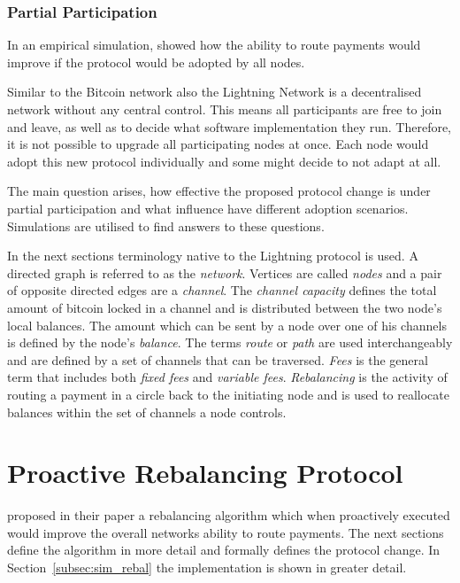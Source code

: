 \documentclass[final]{fhnwreport}       %
\begin{document}
\subsubsection{Partial Participation}
In an empirical simulation, \citeauthor{pickhardt_imbalance_2019} showed how the ability to route payments would improve if the protocol would be adopted by all nodes. 

Similar to the Bitcoin network also the Lightning Network is a decentralised network without any central control. This means all participants are free to join and leave, as well as to decide what software implementation they run. Therefore, it is not possible to upgrade all participating nodes at once. Each node would adopt this new protocol individually and some might decide to not adapt at all. 

The main question arises, how effective the proposed protocol change is under partial participation and what influence have different adoption scenarios. Simulations are utilised to find answers to these questions.

In the next sections terminology native to the Lightning protocol is used. A directed graph is referred to as the \emph{network}. Vertices are called \emph{nodes} and a pair of opposite directed edges are a \emph{channel}. The \emph{channel capacity} defines the total amount of bitcoin locked in a channel and is distributed between the two node's local balances. The amount which can be sent by a node over one of his channels is defined by the node's \emph{balance}. The terms \emph{route} or \emph{path} are used interchangeably and are defined by a set of channels that can be traversed. \emph{Fees} is the general term that includes both \emph{fixed fees} and \emph{variable fees}. \emph{Rebalancing} is the activity of routing a payment in a circle back to the initiating node and is used to reallocate balances within the set of channels a node controls.   

\newpage
\section{Proactive Rebalancing Protocol}\label{sec:rebal}
\textcite{pickhardt_imbalance_2019} proposed in their paper a rebalancing algorithm which when proactively executed would improve the overall networks ability to route payments. The next sections define the algorithm in more detail and formally defines the protocol change. In Section~\ref{subsec:sim_rebal} the implementation is shown in greater detail.
\end{document}
